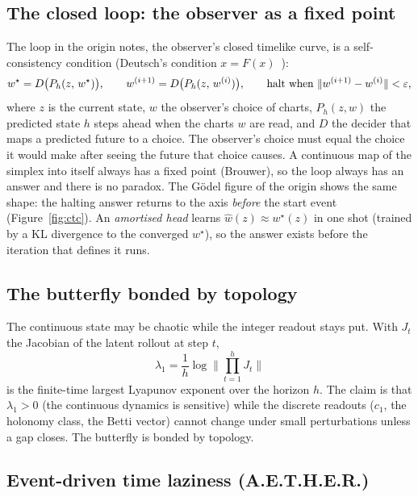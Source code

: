 \subsection{The closed loop: the observer as a fixed point}

The loop in the origin notes, the observer's closed timelike curve, is a self-consistency condition (Deutsch's condition $x=F(x)$~\cite{deutsch1991ctc}):
\begin{equation}\label{eq:fixedpoint}
  w^\star=D\big(P_h(z,\,w^\star)\big),\qquad w^{(i+1)}=D\big(P_h(z,\,w^{(i)})\big),\qquad \text{halt when } \lVert w^{(i+1)}-w^{(i)}\rVert<\varepsilon,
\end{equation}
where $z$ is the current state, $w$ the observer's choice of charts, $P_h(z,w)$ the predicted state $h$ steps ahead when the charts $w$ are read, and $D$ the decider that maps a predicted future to a choice. The observer's choice must equal the choice it would make after seeing the future that choice causes. A continuous map of the simplex into itself always has a fixed point (Brouwer), so the loop always has an answer and there is no paradox. The G\"odel figure of the origin shows the same shape: the halting answer returns to the axis \emph{before} the start event (Figure~\ref{fig:ctc}). An \emph{amortised head} learns $\hat w(z)\approx w^\star(z)$ in one shot (trained by a KL divergence to the converged $w^\star$), so the answer exists before the iteration that defines it runs.

\subsection{The butterfly bonded by topology}

The continuous state may be chaotic while the integer readout stays put. With $J_t$ the Jacobian of the latent rollout at step $t$,
\begin{equation}\label{eq:lyapunov}
  \lambda_1=\frac1h\log\Big\lVert\prod_{t=1}^{h}J_t\Big\rVert
\end{equation}
is the finite-time largest Lyapunov exponent over the horizon $h$. The claim is that $\lambda_1>0$ (the continuous dynamics is sensitive) while the discrete readouts ($c_1$, the holonomy class, the Betti vector) cannot change under small perturbations unless a gap closes. The butterfly is bonded by topology.

\subsection{Event-driven time laziness (A.E.T.H.E.R.)}

